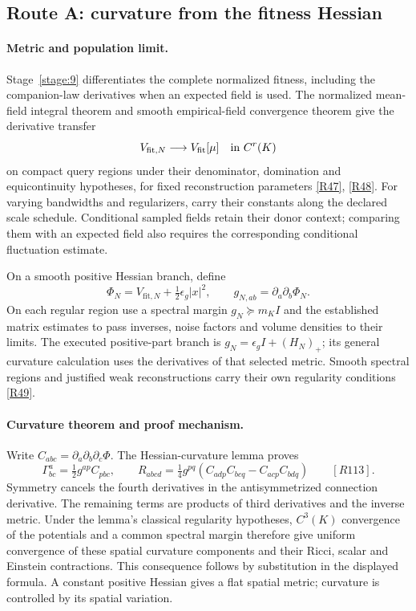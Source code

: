 \documentclass[11pt,a4paper]{article}
\begin{document}
\clearpage
\subsection{Route A: curvature from the fitness Hessian}
\label{sec:gravity-hessian}

\paragraph{Metric and population limit.}
Stage~\ref{stage:9} differentiates the complete normalized fitness, including
the companion-law derivatives when an expected field is used. The normalized
mean-field integral theorem and smooth empirical-field convergence theorem
give the derivative transfer
\[
V_{\mathrm{fit},N}\longrightarrow V_{\mathrm{fit}}[\mu]
\quad\hbox{in }C^r(K)
\]
on compact query regions under their denominator, domination and
equicontinuity hypotheses, for fixed reconstruction parameters
\hyperref[src:thm-cinf-mean-field-integrals]{[R47]}, \hyperref[src:thm-cinf-empirical-field-convergence]{[R48]}.
For varying bandwidths and regularizers, carry their constants along the
declared scale schedule. Conditional sampled fields retain their donor
context; comparing them with an expected field also requires the corresponding
conditional fluctuation estimate.

On a smooth positive Hessian branch, define
\[
\Phi_N=V_{\mathrm{fit},N}+\tfrac12\epsilon_g|x|^2,
\qquad g_{N,ab}=\partial_a\partial_b\Phi_N.
\]
On each regular region use a spectral margin $g_N\succeq m_KI$ and the
established matrix estimates to pass inverses, noise factors and volume
densities to their limits. The executed positive-part branch is
$g_N=\epsilon_gI+(H_N)_+$; its general curvature calculation uses the
derivatives of that selected metric. Smooth spectral regions and justified
weak reconstructions carry their own regularity conditions
\hyperref[src:prop-geometry-clipped-metric]{[R49]}.

\paragraph{Curvature theorem and proof mechanism.}
Write $C_{abc}=\partial_a\partial_b\partial_c\Phi$. The Hessian-curvature
lemma proves
\[
\Gamma^a_{bc}=\tfrac12g^{ap}C_{pbc},\qquad
R_{abcd}=\tfrac14g^{pq}
 (C_{adp}C_{bcq}-C_{acp}C_{bdq})
\qquad \hyperref[src:lem-curvature-hessian-cancellation]{[R113]}.
\]
Symmetry cancels the fourth derivatives in the antisymmetrized connection
derivative. The remaining terms are products of third derivatives and the
inverse metric. Under the lemma's classical regularity hypotheses,
$C^3(K)$ convergence of the potentials and a common spectral margin therefore
give uniform convergence of these spatial curvature components and their
Ricci, scalar and Einstein contractions. This consequence follows by
substitution in the displayed formula. A constant positive Hessian gives a
flat spatial metric; curvature is controlled by its spatial variation.
\end{document}

